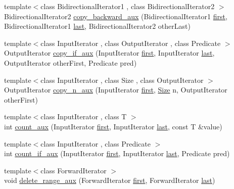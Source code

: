 \begin{DoxyCompactItemize}
\item 
{\footnotesize template$<$class Bidirectional\+Iterator1 , class Bidirectional\+Iterator2 $>$ }\\Bidirectional\+Iterator2 \hyperlink{namespaceprism_af94bcd5517145cc7b62c59a84a776814}{copy\+\_\+backward\+\_\+aux} (Bidirectional\+Iterator1 \hyperlink{namespaceprism_ae3fb7a1926a9e8e59300cd5e370470da}{first}, Bidirectional\+Iterator1 \hyperlink{namespaceprism_abe4956c4e865f55ca126b7fb973b5078}{last}, Bidirectional\+Iterator2 other\+Last)
\item 
{\footnotesize template$<$class Input\+Iterator , class Output\+Iterator , class Predicate $>$ }\\Output\+Iterator \hyperlink{namespaceprism_a06d95b48370d6b89936a81e08f7ed8d7}{copy\+\_\+if\+\_\+aux} (Input\+Iterator \hyperlink{namespaceprism_ae3fb7a1926a9e8e59300cd5e370470da}{first}, Input\+Iterator \hyperlink{namespaceprism_abe4956c4e865f55ca126b7fb973b5078}{last}, Output\+Iterator other\+First, Predicate pred)
\item 
{\footnotesize template$<$class Input\+Iterator , class Size , class Output\+Iterator $>$ }\\Output\+Iterator \hyperlink{namespaceprism_a305d5bebe30595a5d4705a6cef37b52a}{copy\+\_\+n\+\_\+aux} (Input\+Iterator \hyperlink{namespaceprism_ae3fb7a1926a9e8e59300cd5e370470da}{first}, \hyperlink{classprism_1_1_size}{Size} n, Output\+Iterator other\+First)
\item 
{\footnotesize template$<$class Input\+Iterator , class T $>$ }\\int \hyperlink{namespaceprism_a161f644c4e266d280a770bb0c9fbe045}{count\+\_\+aux} (Input\+Iterator \hyperlink{namespaceprism_ae3fb7a1926a9e8e59300cd5e370470da}{first}, Input\+Iterator \hyperlink{namespaceprism_abe4956c4e865f55ca126b7fb973b5078}{last}, const T \&value)
\item 
{\footnotesize template$<$class Input\+Iterator , class Predicate $>$ }\\int \hyperlink{namespaceprism_a8d72a3b00c7e3e537c82829965732dad}{count\+\_\+if\+\_\+aux} (Input\+Iterator \hyperlink{namespaceprism_ae3fb7a1926a9e8e59300cd5e370470da}{first}, Input\+Iterator \hyperlink{namespaceprism_abe4956c4e865f55ca126b7fb973b5078}{last}, Predicate pred)
\item 
{\footnotesize template$<$class Forward\+Iterator $>$ }\\void \hyperlink{namespaceprism_a25e9f7e103a3f2ae15048eb75dc6af97}{delete\+\_\+range\+\_\+aux} (Forward\+Iterator \hyperlink{namespaceprism_ae3fb7a1926a9e8e59300cd5e370470da}{first}, Forward\+Iterator \hyperlink{namespaceprism_abe4956c4e865f55ca126b7fb973b5078}{last})

\end{DoxyCompactItemize}
